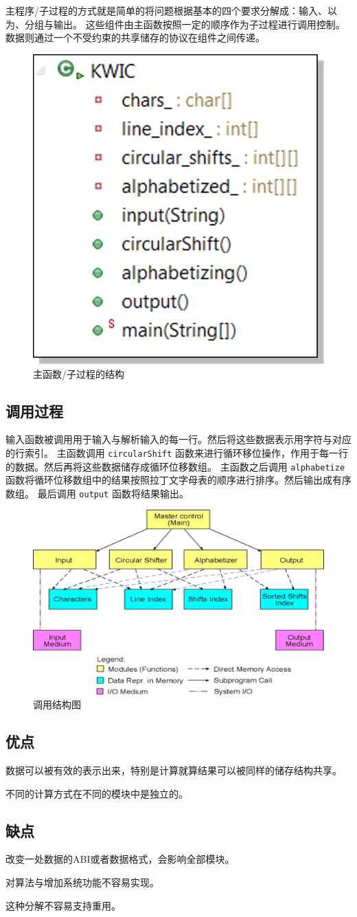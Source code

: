\documentclass{ctexart}
\begin{document}
主程序/子过程的方式就是简单的将问题根据基本的四个要求分解成：输入、以为、分组与输出。
这些组件由主函数按照一定的顺序作为子过程进行调用控制。
数据则通过一个不受约束的共享储存的协议在组件之间传递。
\begin{figure}[h!]
\centering
\includegraphics[width=0.7\linewidth]{homework1-shared_data}
\caption{主函数/子过程的结构}
\label{fig:homework1-shared_data}
\end{figure}
\subsection{调用过程}

输入函数被调用用于输入与解析输入的每一行。然后将这些数据表示用字符与对应的行索引。
主函数调用 \lstinline|circularShift| 函数来进行循环移位操作，作用于每一行的数据。然后再将这些数据储存成循环位移数组。
主函数之后调用 \lstinline|alphabetize| 函数将循环位移数组中的结果按照拉丁文字母表的顺序进行排序。然后输出成有序数组。
最后调用 \lstinline|output| 函数将结果输出。

\begin{figure}[h!]
    \centering
    \includegraphics[width=0.7\linewidth]{homework1-shared_data2}
    \caption{调用结构图}
    \label{fig:homework1-shared_data2}
\end{figure}


\subsection{优点}
数据可以被有效的表示出来，特别是计算就算结果可以被同样的储存结构共享。

不同的计算方式在不同的模块中是独立的。

\subsection{缺点}
改变一处数据的ABI或者数据格式，会影响全部模块。

对算法与增加系统功能不容易实现。

这种分解不容易支持重用。
\end{document}
